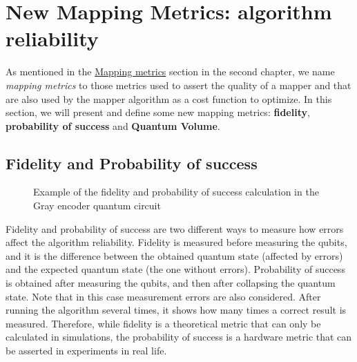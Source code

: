 \section{New Mapping Metrics: algorithm reliability}
\label{sec:org27990de}
As mentioned in the \hyperref[sec:orgc729465]{Mapping metrics} section in the second chapter, we name \emph{mapping metrics} to those metrics used to assert the quality of a mapper and that are also used by the mapper algorithm as a cost function to optimize.
In this section, we will present and  define some new mapping metrics: \textbf{fidelity}, \textbf{probability of success} and \textbf{Quantum Volume}.

\subsection{Fidelity and Probability of success}
\label{sec:org0c7b2c2}

\begin{figure}
    \centering

\caption{Example of the fidelity and probability of success calculation in the Gray encoder quantum circuit}
\label{fig:latency_swaps_ex_orig}
\end{figure}

Fidelity and probability of success  are two different ways to measure how errors affect the algorithm reliability.
Fidelity is measured before measuring the qubits, and it is the difference between the obtained quantum state (affected by errors) and the expected quantum state (the one without errors).  Probability of success is obtained after measuring the qubits, and then  after collapsing the quantum state. Note that in this case measurement errors are also considered. After running the algorithm several times, it shows how many times a correct result is measured.
Therefore, while fidelity is a theoretical metric that can only be calculated in simulations, the probability of success is a hardware metric that can be asserted in experiments in real life.

